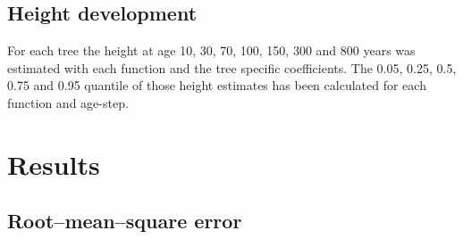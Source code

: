 \documentclass[a4paper,twocolumn]{article}
\begin{document}

\subsection{Height development}

For each tree the height at age 10, 30, 70, 100, 150, 300 and 800
years was estimated with each function and the tree specific coefficients.
The 0.05, 0.25, 0.5, 0.75 and 0.95 quantile of those height estimates has
been calculated for each function and age-step.


\section{Results}

\subsection{Root--mean--square error}
\end{document}

